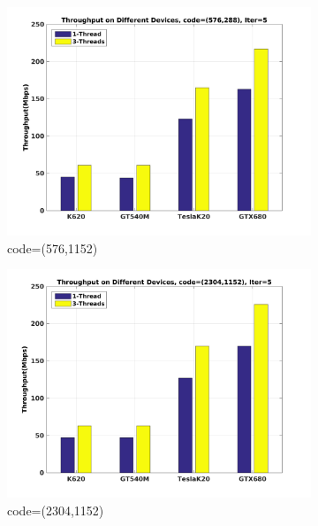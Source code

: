 \documentclass{article}
\begin{document}
\begin{figure}[H]
  \begin{subfigure}[b]{0.6\textwidth}
    \includegraphics[width=\textwidth]{c_576_5.jpg}
    \caption{code=(576,1152)}
    \label{fig:throu_5_a}
  \end{subfigure}
  \begin{subfigure}[b]{0.6\textwidth}
    \includegraphics[width=\textwidth]{c_2304_5.jpg}
    \caption{code=(2304,1152)}
    \label{fig:throu_5_b}
  \end{subfigure}
  \\
    \begin{subfigure}[b]{0.7\textwidth}

\end{subfigure}
\end{figure}
\end{document}
